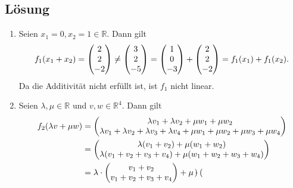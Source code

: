 \documentclass[german,12pt]{homework}
\newcommand{\RR}{\mathbb{R}}
\DeclarePairedDelimiter{\enbrace}{(}{)}
\begin{document}
    \subsection*{Lösung}
    \begin{enumerate}
        \item Seien \(x_1 = 0, x_2 = 1 \in \RR\). Dann gilt
        \[f_1\enbrace*{x_1 + x_2} = \begin{pmatrix}2\\2\\-2
        \end{pmatrix} \ne \begin{pmatrix}3\\2\\-5\end{pmatrix} = \begin{pmatrix}
        1\\0\\-3\end{pmatrix} + \begin{pmatrix}2\\2\\-2\end{pmatrix} =
        f_1\enbrace*{x_1} + f_1\enbrace*{x_2}.\]
        Da die Additivität nicht erfüllt ist, ist \(f_1\) nicht linear.
        \item Seien \(\lambda, \mu \in \RR\) und \(v, w \in \RR^4\).
        Dann gilt
        \begin{align*}
            f_2\enbrace*{\lambda{v} + \mu{w}} &= \begin{pmatrix}
                \lambda{v_1} + \lambda{v_2} + \mu{w_1} + \mu{w_2}\\
                \lambda{v_1} + \lambda{v_2} + \lambda{v_3} + \lambda{v_4}
                + \mu{w_1} + \mu{w_2} + \mu{w_3} + \mu{w_4}
            \end{pmatrix}\\
            &= \begin{pmatrix}
                \lambda\enbrace*{v_1 + v_2} + \mu\enbrace*{w_1 + w_2}\\
                \lambda\enbrace*{v_1 + v_2 + v_3 + v_4}
                + \mu\enbrace*{w_1 + w_2 + w_3 + w_4}
            \end{pmatrix}\\
            &= \lambda \cdot \begin{pmatrix}
                v_1 + v_2\\
                v_1 + v_2 + v_3 + v_4
            \end{pmatrix} + \mu \cdot \begin{pmatrix}

\end{pmatrix}
\end{align*}
\end{enumerate}
\end{document}
